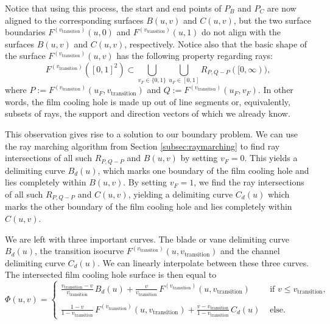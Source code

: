\documentclass[a4paper, 11pt]{report}
\theoremstyle{definition}
\begin{document}
	Notice that using this process, the start and end points of $P_B$ and $P_C$ are now aligned to the corresponding surfaces $B(u,v)$ and $C(u,v)$, but the two surface boundaries $F^{(v_\textrm{transition})}(u,0)$ and $F^{(v_\textrm{transition})}(u,1)$ do not align with the surfaces $B(u,v)$ and $C(u,v)$, respectively. Notice also that the basic shape of the surface $F^{(v_\textrm{transition})}(u,v)$ has the following property regarding rays:
		$$ F^{(v_\textrm{transition})}([0,1]^2) \subset \bigcup_{v_F \in \{0,1\}}\bigcup_{u_F\in[0,1]} R_{P,Q-P}([0, \infty)), $$
	where $P := F^{(v_\textrm{transition})}(u_F,v_\textrm{transition})$ and $Q := F^{(v_\textrm{transition})}(u_F,v_F)$.
	In other words, the film cooling hole is made up out of line segments or, equivalently, subsets of rays, the support and direction vectors of which we already know.

	This observation gives rise to a solution to our boundary problem. We can use the ray marching algorithm from Section \ref{subsec:raymarching} to find ray intersections of all such $R_{P,Q-P}$ and $B(u,v)$ by setting $v_F = 0$. This yields a delimiting curve $B_d(u)$, which marks one boundary of the film cooling hole and lies completely within $B(u,v)$. By setting $v_F = 1$, we find the ray intersections of all such $R_{P, Q-P}$ and $C(u,v)$, yielding a delimiting curve $C_d(u)$ which marks the other boundary of the film cooling hole and lies completely within $C(u,v)$.

	We are left with three important curves. The blade or vane delimiting curve $B_d(u)$, the transition isocurve $F^{(v_\textrm{transition})}(u,v_\textrm{transition})$ and the channel delimiting curve $C_d(u)$. We can linearly interpolate between these three curves. The intersected film cooling hole surface is then equal to
		$$ \Phi(u,v) = 
				\begin{cases}
					\frac{v_\textrm{transition} - v}{v_\textrm{transition}} \, B_d(u) +
					\frac{v}{v_\textrm{transition}} \, F^{(v_\textrm{transition})}(u,v_\textrm{transition})
					& \textrm{ if } v \leq v_\textrm{transition}, \\

					\\[-0.5em]
					
					\frac{1 - v}{1 - v_\textrm{transition}} \, F^{(v_\textrm{transition})}(u,v_\textrm{transition}) + 
					\frac{v - v_\textrm{transition}}{1 - v_\textrm{transition}} \, C_d(u)		
					& \textrm{ else.}

				\end{cases}
		 $$
\end{document}
